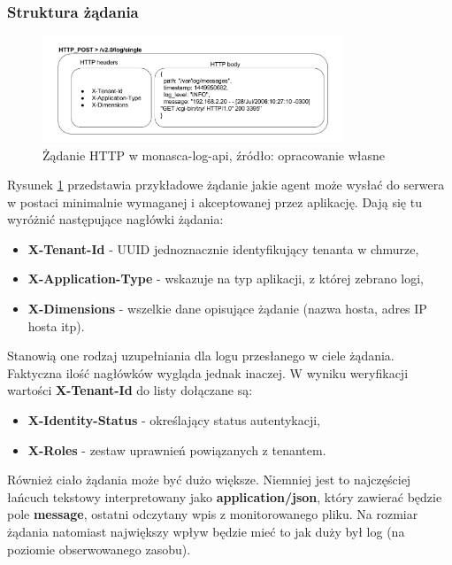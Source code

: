    \subsubsection{Struktura żądania}
    \begin{figure}[h]
        \centering
        \includegraphics[width=0.80\textwidth]{images/monasca_log_api_request}
        \caption[Żądanie HTTP w monasca-log-api]{
             Żądanie HTTP w monasca-log-api, źródło: opracowanie własne
        }
        \label{chapter:monasca:monasca_log_api:request}
    \end{figure}
    Rysunek \ref{chapter:monasca:monasca_log_api:request} przedstawia przykładowe
    żądanie jakie agent może wysłać do serwera w postaci minimalnie wymaganej
    i akceptowanej przez aplikację. Dają się tu wyróżnić następujące nagłówki żądania:
    \begin{itemize}
        \item \textbf{X-Tenant-Id} - UUID jednoznacznie identyfikujący tenanta w chmurze,
        \item \textbf{X-Application-Type} - wskazuje na typ aplikacji, z której zebrano logi,
        \item \textbf{X-Dimensions} - wszelkie dane opisujące żądanie (nazwa hosta, adres IP hosta itp).
    \end{itemize}
    Stanowią one rodzaj uzupełniania dla logu przesłanego w ciele żądania. Faktyczna ilość nagłówków wygląda 
    jednak inaczej. W wyniku weryfikacji wartości \textbf{X-Tenant-Id} do listy dołączane są:
    \begin{itemize}
        \item \textbf{X-Identity-Status} - określający status autentykacji,
        \item \textbf{X-Roles} - zestaw uprawnień powiązanych z tenantem.
    \end{itemize}
    
    Również ciało żądania może być dużo większe. Niemniej jest to najczęściej łańcuch tekstowy
    interpretowany jako \textbf{application/json}, który zawierać będzie pole \textbf{message},
    ostatni odczytany wpis z monitorowanego pliku. Na rozmiar żądania natomiast największy wpływ będzie mieć
    to jak duży był log (na poziomie obserwowanego zasobu). 
    
